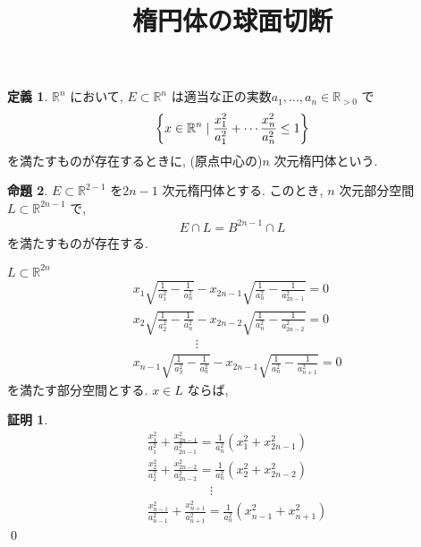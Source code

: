 \documentclass[10pt, fleqn, label-section=none]{bxjsarticle}
\title{楕円体の球面切断}
\date{}
\author{}
\theoremstyle{definition}
\newtheorem{dfn}{定義}[section]
\newtheorem{prop}[dfn]{命題}
\newtheorem*{pf*}{証明}
\newcommand{\cbra}[1]{\mleft\{#1\mright\}}
\renewcommand{\;}{\, ; \,}
\begin{document}
\maketitle

\section{}


\begin{dfn}$\mathbb R^n$ において, $E \subset \mathbb R^n$ は適当な正の実数$a_1, \ldots, a_n \in \mathbb R_{>0}$ で
\begin{align*} \cbra{x \in \mathbb R^n \mid \frac{x_1^2}{a_1^2} + \cdots \frac{x_n^2}{a_n^2} \leq 1 }\end{align*}
を満たすものが存在するときに, (原点中心の)$n$ 次元楕円体という. 
\end{dfn}

\begin{prop}$E \subset \mathbb R^{2-1}$ を$2n-1$ 次元楕円体とする. このとき, $n$ 次元部分空間$L \subset \mathbb R^{2n -1}$ で, 
\begin{align*} E \cap L = B^{2n-1} \cap L\end{align*}
を満たすものが存在する. 
\end{prop}
$L \subset \mathbb R^{2n}$
\begin{align*} &x_1 \sqrt{\frac{1}{a_1^2} - \frac{1}{a_n^2}} - x_{2n-1} \sqrt{\frac{1}{a_n^2} - \frac{1}{a_{2n-1}^2} }  = 0
\\& x_2 \sqrt{\frac{1}{a_2^2} - \frac{1}{a_n^2}} - x_{2n-2} \sqrt{\frac{1}{a_n^2} - \frac{1}{a_{2n-2}^2} }  = 0
\\& \quad  \quad \quad \quad \quad  \vdots 
\\& x_{n-1} \sqrt{\frac{1}{a_3^2} - \frac{1}{a_n^2}} - x_{2n-1} \sqrt{\frac{1}{a_n^2} - \frac{1}{a_{n+1}^2} }  = 0 \end{align*}
を満たす部分空間とする. $x \in L$ ならば, 

\begin{pf*}
\begin{align*} &\frac{x_1^2}{a_1^2} + \frac{x_{2n-1}^2}{a_{2n-1}^2} = \frac{1}{a_n^2} (x_1^2 + x_{2n-1}^2  ) 
\\ &\frac{x_2^2}{a_2^2} + \frac{x_{2n-2}^2}{a_{2n-2}^2} = \frac{1}{a_n^2} (x_2^2 + x_{2n-2}^2  )  
\\ &\quad  \quad \quad \quad \quad  \vdots 
\\ &\frac{x_{n-1}^2}{a_{n-1}^2} + \frac{x_{n +1}^2}{a_{n+1}^2} = \frac{1}{a_n^2} (x_{n-1}^2 + x_{n +1}^2  )  \end{align*}
\qed
\end{pf*}
\end{document}
